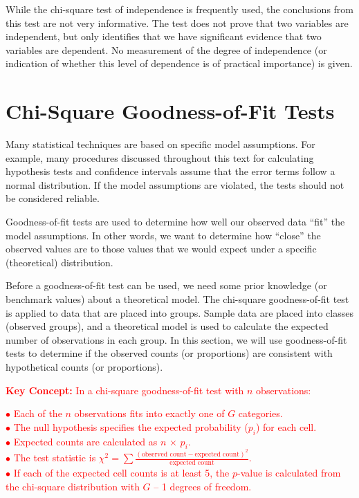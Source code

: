 \documentclass[
]{report}
\begin{document}
While the chi-square test of independence is frequently used, the conclusions from this test are not very
informative. The test does not prove that two variables are independent, but only identifies that we have
significant evidence that two variables are dependent. No measurement of the degree of independence (or
indication of whether this level of dependence is of practical importance) is given.

\hypertarget{chi-square-goodness-of-fit-tests}{%
\section{\texorpdfstring{\textbf{Chi-Square Goodness-of-Fit Tests}}{Chi-Square Goodness-of-Fit Tests}}\label{chi-square-goodness-of-fit-tests}}

Many statistical techniques are based on specific model assumptions. For example, many procedures discussed throughout this text for calculating hypothesis tests and confidence intervals assume that the error terms follow a normal distribution. If the model assumptions are violated, the tests should not be considered reliable.

Goodness-of-fit tests are used to determine how well our observed data ``fit'' the model assumptions. In other words, we want to determine how ``close'' the observed values are to those values that we would expect under a specific (theoretical) distribution.

Before a goodness-of-fit test can be used, we need some prior knowledge (or benchmark values) about a theoretical model. The chi-square goodness-of-fit test is applied to data that are placed into groups. Sample data are placed into classes (observed groups), and a theoretical model is used to calculate the expected number of observations in each group. In this section, we will use goodness-of-fit tests to determine if the observed counts (or proportions) are consistent with hypothetical counts (or proportions).

\Large

\textbf{\textcolor{red}{Key Concept:}}
\textcolor{red}{In a chi-square goodness-of-fit test with $n$ observations:}

\textcolor{red}{$\bullet$ Each of the $n$ observations fits into exactly one of $G$ categories.}\\
\textcolor{red}{$\bullet$ The null hypothesis specifies the expected probability ($p_i$) for each cell.}\\
\textcolor{red}{$\bullet$ Expected counts are calculated as $n$ × $p_i$.}\\
\textcolor{red}{$\bullet$ The test statistic is $\chi^2 = \sum \frac{(\text{observed count} - \text{expected count})^2}{\text{expected count}}$.}\\
\textcolor{red}{$\bullet$ If each of the expected cell counts is at least 5, the $p$-value is calculated from the chi-square distribution with $G$ – 1 degrees of freedom.}
\normalsize
\end{document}
